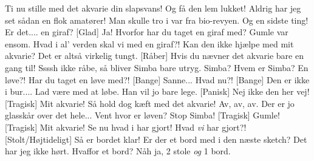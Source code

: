 \documentclass[a4paper,11pt]{article}
\begin{document}
\begin{sketch}
 Ti nu stille med det akvarie din slapsvans! Og få den lem lukket! Aldrig har jeg set sådan en flok amatører! Man skulle tro i var fra bio-revyen. 
 Og en sidste ting!  Er det.... en giraf?
[Glad] Ja!
 Hvorfor har du taget en giraf med?
 Gumle var ensom.
 Hvad i al' verden skal vi med en giraf?! 
 Kan den ikke hjælpe med mit akvarie? Det er altså virkelig tungt.
[Råber] Hvis du nævner det akvarie bare en gang til!
 Ssssh ikke råbe, så bliver Simba bare utryg.
 Simba? Hvem er Simba?
 En løve?! Har du taget en løve med?!
[Bange] Sanne...
 Hvad nu?!
[Bange] Den er ikke i bur....
 
 Lad være med at løbe. Han vil jo bare lege.
 
[Panisk] Nej ikke den her vej!
[Tragisk] Mit akvarie!
 Så hold dog kæft med det akvarie! 
 Av, av, av. Der er jo glasskår over det hele... Vent hvor er løven?
 Stop Simba!
[Tragisk] Gumle! 
[Tragisk] Mit akvarie! 
 Se nu hvad i har gjort!
 Hvad \emph{vi} har gjort?! 
[Stolt/Højtideligt] Så er bordet klar!
 Er der et bord med i den næste sketch?
 Det har jeg ikke hørt.
 Hvaffor et bord?
 Nåh ja, 2 stole \emph{og} 1 bord.







\end{sketch}
\end{document}
